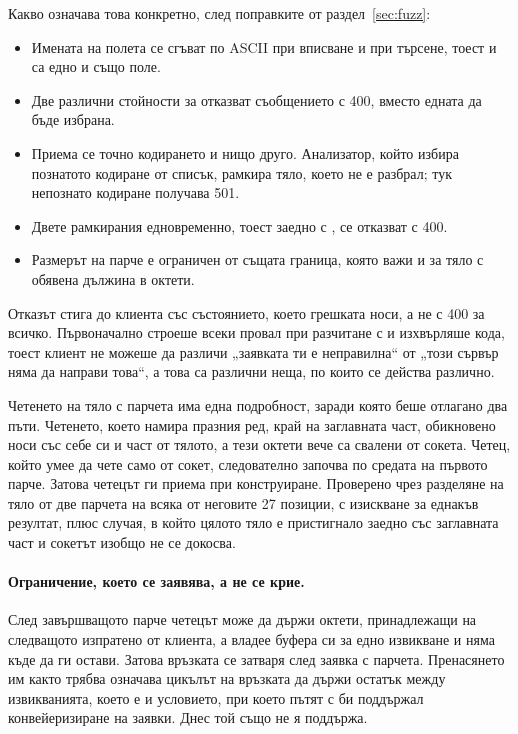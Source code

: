 Какво означава това конкретно, след поправките от раздел~\ref{sec:fuzz}:

\begin{itemize}
\item Имената на полета се сгъват по ASCII при вписване и при търсене, тоест
 и  са едно и също поле.
\item Две различни стойности за  отказват съобщението с 400, вместо
едната да бъде избрана.
\item Приема се точно кодирането  и нищо друго. Анализатор, който избира
познатото кодиране от списък, рамкира тяло, което не е разбрал; тук непознато кодиране
получава 501.
\item Двете рамкирания едновременно, тоест  заедно с
, се отказват с 400.
\item Размерът на парче е ограничен от същата граница, която важи и за тяло с обявена
дължина в октети.
\end{itemize}

Отказът стига до клиента със състоянието, което грешката носи, а не с 400 за всичко.
Първоначално  строеше всеки провал при разчитане с
 и изхвърляше кода, тоест клиент не можеше да различи „заявката
ти е неправилна“ от „този сървър няма да направи това“, а това са различни неща, по които се
действа различно.

Четенето на тяло с парчета има една подробност, заради която беше отлагано два пъти. Четенето,
което намира празния ред, край на заглавната част, обикновено носи със себе си и част от
тялото, а тези октети вече са свалени от сокета. Четец, който умее да чете само от сокет,
следователно започва по средата на първото парче. Затова четецът ги приема при конструиране.
Проверено чрез разделяне на тяло от две парчета на всяка от неговите 27 позиции, с изискване
за еднакъв резултат, плюс случая, в който цялото тяло е пристигнало заедно със заглавната
част и сокетът изобщо не се докосва.

\paragraph{Ограничение, което се заявява, а не се крие.} След завършващото парче четецът може
да държи октети, принадлежащи на следващото изпратено от клиента, а 
владее буфера си за едно извикване и няма къде да ги остави. Затова връзката се затваря след
заявка с парчета. Пренасянето им както трябва означава цикълът на връзката да държи остатък
между извикванията, което е и условието, при което пътят с  би поддържал
конвейеризиране на заявки. Днес той също не я поддържа.

